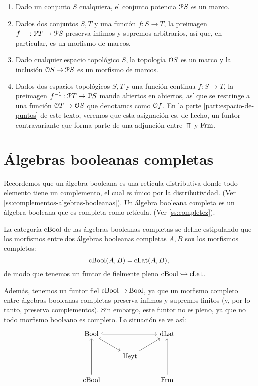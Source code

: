 \begin{example}
  \begin{enumerate}
    \item Dado un conjunto $S$ cualquiera, el conjunto potencia
    $\cal PS$ es un marco.
    \item Dados dos conjuntos $S,T$ y una función $f:S\to T$,
    la preimagen $f^{-1}:\cal PT\to\cal PS$ preserva ínfimos
    y supremos arbitrarios, así que, en particular, es un
    morfismo de marcos.
    \item Dado cualquier espacio topológico $S$, la topología
    $\cal OS$ es un marco y la inclusión $\cal OS\to\cal PS$
    es un morfismo de marcos.
    \item Dados dos espacios topológicos $S,T$ y una función
    continua $f:S\to T$, la preimagen $f^{-1}:\cal PT\to\cal
    PS$ manda abiertos en abiertos, así que se restringe a
    una función $\cal OT\to\cal OS$ que denotamos como $\cal
    Of$.
    En la parte \ref{part:espacio-de-puntos} de este texto,
    veremos que esta asignación es, de hecho, un funtor
    contravariante que forma parte de una
    adjunción entre $\Top$ y $\Frm$.
  \end{enumerate}
\end{example}

\section{Álgebras booleanas completas}\label{ABC}
Recordemos que un álgebra booleana es una retícula distributiva
donde todo elemento tiene un complemento, el cual es único por la
distributividad. (Ver \ref{ss:complementos-algebras-booleanas}).
Un álgebra booleana completa es un álgebra booleana que es
completa como retícula. (Ver \ref{ss:completez}).


La categoría $\CBA$ de las álgebras booleanas completas se define
estipulando que los morfismos entre dos álgebras booleanas
completas $A,B$ son los morfismos completos:
\[
  \CBA(A,B)=\CLat(A,B)
,\]
de modo que tenemos un funtor de fielmente pleno
$\CBA\rmono\CLat$.

Además, tenemos un funtor fiel $\CBA\to\Bool$, ya que un morfismo
completo entre álgebras booleanas completas preserva ínfimos y
supremos finitos (y, por lo tanto, preserva complementos).
Sin embargo, este funtor no es pleno, ya que no todo morfismo booleano
es completo.
La situación se ve así:
\begin{equation}\label{diag:cuadrado-incompleto}
\begin{tikzcd}
  \Bool \ar[dr,hook] \ar[rr,hook] &               & \DLat \\
                                  & \Heyt \ar[ur]         \\
  \CBA \ar[uu] &           & \Frm \ar[uu]
\end{tikzcd}
\end{equation}

